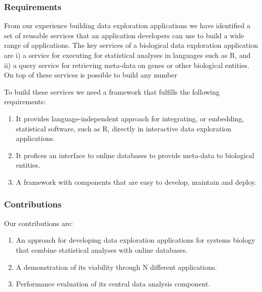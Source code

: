 

\subsubsection*{Requirements} 
From our experience building data exploration applications we have identified a
set of reusable services that an application developers can use to build a wide
range of applications. The key services of a biological data exploration
application are i) a service for executing for statistical analyses in languages
such as R, and ii) a query service for retrieving meta-data on genes or other
biological entities. On top of these services is possible to build any number 

To build these services we need a framework that fulfills the following
requirements: 

\begin{enumerate}
    \item It provides language-independent approach for integrating, or
        embedding, statistical software, such as R, directly in interactive data
        exploration applications.
    \item It profices an interface to online databases to provide meta-data to
        biological entities. %
    \item A framework with components that are easy to develop, maintain and
        deploy. 
\end{enumerate} 


\subsubsection*{Contributions} 
Our contributions are: 
\begin{enumerate}
\item An approach for developing data exploration applications for systems
biology that combine statistical analyses with online databases.  
\item A demonstration of its viability through N different applications. 
\item Performance evaluation of its central data analysis component. 
\end{enumerate} 

